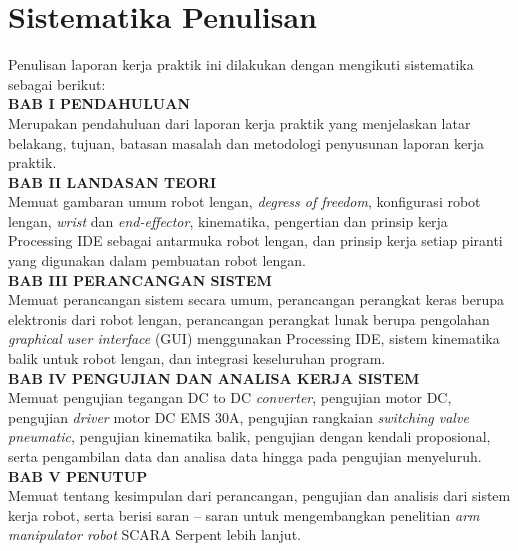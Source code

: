 \section{Sistematika Penulisan}
Penulisan laporan kerja praktik ini dilakukan dengan mengikuti sistematika sebagai berikut:\\
\noindent
\textbf{BAB I\hspace*{0.6cm} PENDAHULUAN}\\
\noindent
Merupakan pendahuluan dari laporan kerja praktik yang menjelaskan latar belakang, tujuan, batasan masalah dan metodologi penyusunan laporan kerja praktik.\\
\noindent
\textbf{BAB II\hspace*{0.5cm} LANDASAN TEORI}\\
\noindent
Memuat gambaran umum robot lengan, \emph {degress of freedom}, konfigurasi robot lengan, \emph{wrist} dan \textit{end-effector}, kinematika, pengertian dan prinsip kerja Processing IDE sebagai antarmuka robot lengan, dan prinsip kerja setiap piranti yang digunakan dalam pembuatan robot lengan. \\
\textbf{BAB III\hspace*{0.375cm}  PERANCANGAN SISTEM}\\
\noindent
Memuat perancangan sistem secara umum, perancangan perangkat keras berupa elektronis dari robot lengan, perancangan perangkat lunak berupa pengolahan \textit{graphical user interface} (GUI) menggunakan Processing IDE, sistem kinematika balik untuk robot lengan, dan integrasi keseluruhan program. \\
\textbf{BAB IV\hspace*{0.4cm}  PENGUJIAN DAN ANALISA KERJA SISTEM }\\
\noindent
Memuat pengujian tegangan DC to DC \textit{converter}, pengujian motor DC, pengujian \textit{driver} motor DC EMS 30A, pengujian rangkaian \textit{switching valve pneumatic}, pengujian kinematika balik, pengujian dengan kendali proposional, serta pengambilan data dan analisa data hingga pada pengujian menyeluruh.\\
\textbf{BAB V\hspace*{0.6cm} PENUTUP}\\
Memuat tentang kesimpulan dari perancangan, pengujian dan analisis dari sistem kerja robot, serta berisi saran – saran untuk mengembangkan penelitian \emph{ arm manipulator robot} SCARA Serpent lebih lanjut. \\